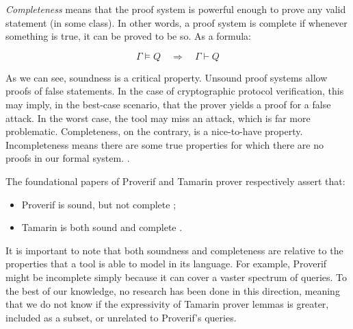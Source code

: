 \textit{Completeness} means that the proof system is powerful enough to prove any valid statement (in some class). In other words, a proof system is complete if whenever something is true, it can be proved to be so. As a formula:

\begin{equation}
    \Gamma \models Q \quad \Longrightarrow \quad \Gamma \vdash Q
\end{equation}

As we can see, soundness is a critical property. Unsound proof systems allow proofs of false statements. In the case of cryptographic protocol verification, this may imply, in the best-case scenario, that the prover yields a proof for a false attack. In the worst case, the tool may miss an attack, which is far more problematic.
Completeness, on the contrary, is a nice-to-have property. Incompleteness means there are some true properties for which there are no proofs in our formal system. \cite{slides_on_sound_complete}.

The foundational papers of Proverif and Tamarin prover respectively assert that:
\begin{itemize}
    \item Proverif is sound, but not complete \cite{ProverifManual};
    \item Tamarin is both sound and complete \cite{TamarinFoundations, TamarinFoundationsExtended, xor_tamarin}.
\end{itemize}

It is important to note that both soundness and completeness are relative to the properties that a tool is able to model in its language. For example, Proverif might be incomplete simply because it can cover a vaster spectrum of queries. To the best of our knowledge, no research has been done in this direction, meaning that we do not know if the expressivity of Tamarin prover lemmas is greater, included as a subset, or unrelated to Proverif's queries.